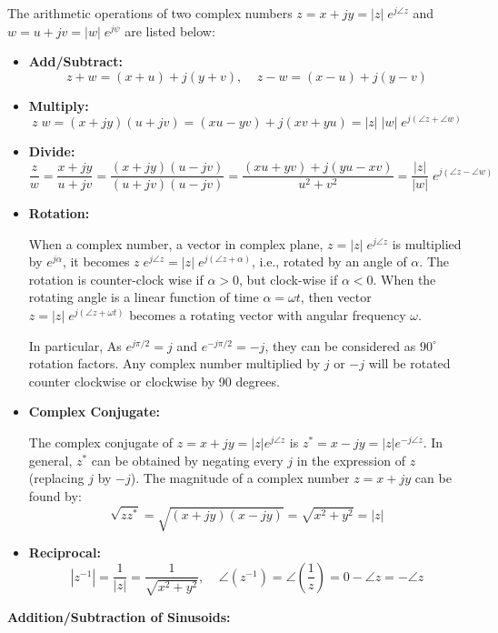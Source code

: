 The arithmetic operations of two complex numbers $z=x+jy=|z|\;e^{j\angle z}$ 
and $w=u+jv=|w|\;e^{j\psi}$ are listed below:
\begin{itemize}
\item {\bf Add/Subtract:} 
  \[	z+w=(x+u)+j(y+v),\;\;\;\;z-w=(x-u)+j(y-v)	\]

\item {\bf Multiply:}
  \[ z\;w=(x+jy)(u+jv)=(xu-yv)+j(xv+yu)=|z|\;|w|\;e^{j(\angle z+\angle w)} \]

\item {\bf Divide:}
  \[	\frac{z}{w}=\frac{x+jy}{u+jv}=\frac{(x+jy)(u-jv)}{(u+jv)(u-jv)}
	=\frac{(xu+yv)+j(yu-xv)}{u^2+v^2}
	=\frac{|z|}{|w|}\;e^{j(\angle z-\angle w)}	\]

\item {\bf Rotation:}

  When a complex number, a vector in complex plane, $z=|z|\;e^{j\angle z}$ is
  multiplied by $e^{j\alpha}$, it becomes $z\;e^{j\angle z}=|z|\;e^{j(\angle z+\alpha)}$, 
  i.e., rotated by an angle of $\alpha$. The rotation is counter-clock wise
  if $\alpha>0$, but clock-wise if $\alpha<0$. When the rotating angle is a 
  linear function of time $\alpha=\omega t$, then vector
  $z=|z|\;e^{j(\angle z+\omega t)}$ becomes a rotating vector with angular frequency
  $\omega$.

  In particular, As $e^{j\pi/2}=j$ and $e^{-j\pi/2}=-j$, they can be considered 
  as $90^\circ$ rotation factors. Any complex number multiplied by $j$ or $-j$ 
  will be rotated counter clockwise or clockwise by 90 degrees.

\item {\bf Complex Conjugate:}

  The complex conjugate of $z=x+jy=|z|e^{j\angle z}$ is 
  $z^*=x-jy=|z|e^{-j\angle z} $. In general, $z^*$ can be obtained by
  negating every $j$ in the expression of $z$ (replacing $j$ by $-j$). 
  The magnitude of a complex number $z=x+jy$ can be found by:
  \[	
  \sqrt{zz^*}=\sqrt{(x+jy)(x-jy)}=\sqrt{x^2+y^2}=|z|
  \]

\item {\bf Reciprocal:}
  \[	|z^{-1}|=\frac{1}{|z|}=\frac{1}{\sqrt{x^2+y^2}},\;\;\;\;
	\angle\left(z^{-1}\right)=\angle\left(\frac{1}{z}\right)
        =0-\angle{z}=-\angle z	\]

\end{itemize}

{\bf Addition/Subtraction of Sinusoids:}

